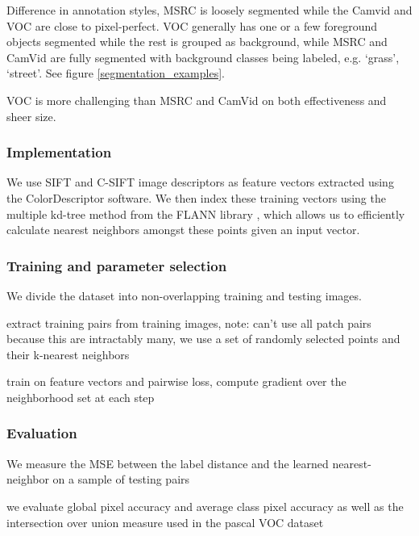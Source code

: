 Difference in annotation styles, MSRC is loosely segmented while the Camvid and VOC are close to pixel-perfect. VOC generally has one or a few foreground objects segmented while the rest is grouped as background, while MSRC and CamVid are fully segmented with background classes being labeled, e.g. `grass', `street'. See figure \ref{segmentation_examples}.

VOC is more challenging than MSRC and CamVid on both effectiveness and sheer size.


\subsubsection{Implementation}

We use SIFT and C-SIFT image descriptors as feature vectors extracted using the ColorDescriptor software. \cite{sande2011empowering} We then index these training vectors using the multiple kd-tree method from the FLANN library \cite{muja2009fast}, which allows us to efficiently calculate nearest neighbors amongst these points given an input vector.


\subsubsection{Training and parameter selection}

We divide the dataset into non-overlapping training and testing images. 


extract training pairs from training images, note: can't use all patch pairs because this are intractably many, we use a set of randomly selected points and their k-nearest neighbors

train on feature vectors and pairwise loss, compute gradient over the neighborhood set at each step







\subsubsection{Evaluation}



We measure the \ac{MSE} between the label distance and the learned nearest-neighbor on a sample of testing pairs


we evaluate global pixel accuracy and average class pixel accuracy as well as the intersection over union measure used in the pascal VOC dataset

